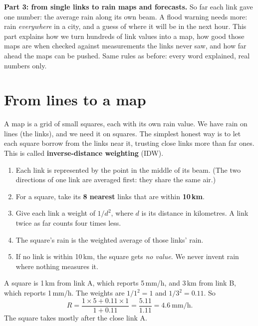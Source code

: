 \clearpage
\begin{center}
\begin{minipage}{0.86\textwidth}
\small
\textbf{Part 3: from single links to rain maps and forecasts.} So far each link gave one number: the average rain along
its own beam. A flood warning needs more: rain \emph{everywhere} in a city, and a guess of where it will be in the next
hour. This part explains how we turn hundreds of link values into a map, how good those maps are when checked against
measurements the links never saw, and how far ahead the maps can be pushed. Same rules as before: every word explained,
real numbers only.
\end{minipage}
\end{center}

\section{From lines to a map}
\label{sec:maps}

A map is a grid of small squares, each with its own rain value. We have rain on lines (the links), and we need it on
squares. The simplest honest way is to let each square borrow from the links near it, trusting close links more than far
ones. This is called \textbf{inverse-distance weighting} (IDW).

\begin{enumerate}
\item Each link is represented by the point in the middle of its beam. (The two directions of one link are averaged
first: they share the same air.)
\item For a square, take its \textbf{8 nearest} links that are within \textbf{10\,km}.
\item Give each link a weight of $1/d^2$, where $d$ is its distance in kilometres. A link twice as far counts four times less.
\item The square's rain is the weighted average of those links' rain.
\item If no link is within 10\,km, the square gets \emph{no value}. We never invent rain where nothing measures it.
\end{enumerate}

\begin{example}
A square is 1\,km from link A, which reports 5\,mm/h, and 3\,km from link B, which reports 1\,mm/h. The weights are
$1/1^2 = 1$ and $1/3^2 = 0.11$. So
\[
R = \frac{1 \times 5 + 0.11 \times 1}{1 + 0.11} = \frac{5.11}{1.11} = 4.6\ \text{mm/h}.
\]
The square takes mostly after the close link A.
\end{example}

